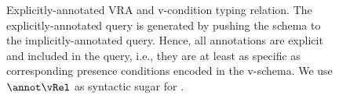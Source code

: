 \begin{figure}
\begin{mathpar}
  \end{mathpar}

\caption{Explicitly-annotated VRA and v-condition typing relation. The explicitly-annotated
query is generated by pushing the schema to the implicitly-annotated query. Hence,
all annotations are explicit and included in the query, i.e., they are at least as specific as
corresponding presence conditions encoded in the v-schema. We use 
\ensuremath{\annot \vRel} as syntactic sugar for \chc {\vRel, \empRel}.
}
\label{fig:vq-stat-sem}
\end{figure}

